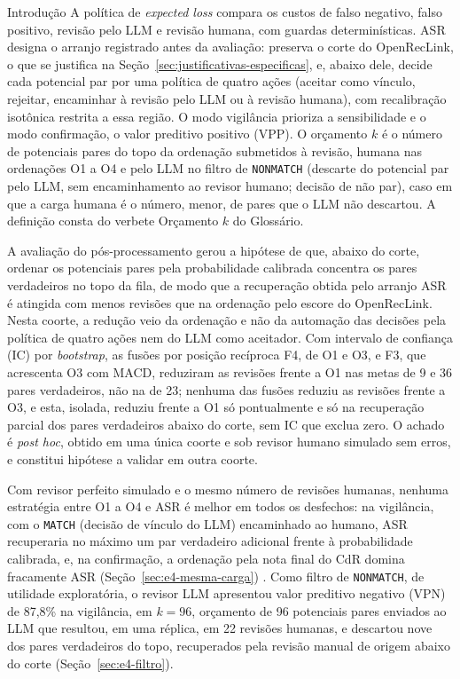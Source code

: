 \begin{chapter}{Introdução}
A política de \textit{expected loss} compara os custos de falso negativo, falso positivo, revisão pelo LLM e revisão humana, com guardas determinísticas. ASR designa o arranjo registrado antes da avaliação: preserva o corte do OpenRecLink, o que se justifica na Seção~\ref{sec:justificativas-especificas}, e, abaixo dele, decide cada potencial par por uma política de quatro ações (aceitar como vínculo, rejeitar, encaminhar à revisão pelo LLM ou à revisão humana), com recalibração isotônica restrita a essa região. O modo vigilância prioriza a sensibilidade e o modo confirmação, o valor preditivo positivo (VPP). O orçamento $k$ é o número de potenciais pares do topo da ordenação submetidos à revisão, humana nas ordenações O1 a O4 e pelo LLM no filtro de \texttt{NONMATCH} (descarte do potencial par pelo LLM, sem encaminhamento ao revisor humano; decisão de não par), caso em que a carga humana é o número, menor, de pares que o LLM não descartou. A definição consta do verbete Orçamento $k$ do Glossário.

A avaliação do pós-processamento gerou a hipótese de que, abaixo do corte, ordenar os potenciais pares pela probabilidade calibrada concentra os pares verdadeiros no topo da fila, de modo que a recuperação obtida pelo arranjo ASR é atingida com menos revisões que na ordenação pelo escore do OpenRecLink. Nesta coorte, a redução veio da ordenação e não da automação das decisões pela política de quatro ações nem do LLM como aceitador. Com intervalo de confiança (IC) por \textit{bootstrap}, as fusões por posição recíproca F4, de O1 e O3, e F3, que acrescenta O3 com MACD, reduziram as revisões frente a O1 nas metas de 9 e 36 pares verdadeiros, não na de 23; nenhuma das fusões reduziu as revisões frente a O3, e esta, isolada, reduziu frente a O1 só pontualmente e só na recuperação parcial dos pares verdadeiros abaixo do corte, sem IC que exclua zero. O achado é \textit{post hoc}, obtido em uma única coorte e sob revisor humano simulado sem erros, e constitui hipótese a validar em outra coorte.

Com revisor perfeito simulado e o mesmo número de revisões humanas, nenhuma estratégia entre O1 a O4 e ASR é melhor em todos os desfechos: na vigilância, com o \texttt{MATCH} (decisão de vínculo do LLM) encaminhado ao humano, ASR recuperaria no máximo um par verdadeiro adicional frente à probabilidade calibrada, e, na confirmação, a ordenação pela nota final do CdR domina fracamente ASR (Seção~\ref{sec:e4-mesma-carga}) \cite{Jardim2026phdrepo}. Como filtro de \texttt{NONMATCH}, de utilidade exploratória, o revisor LLM apresentou valor preditivo negativo (VPN) de 87,8\% na vigilância, em $k=96$, orçamento de 96 potenciais pares enviados ao LLM que resultou, em uma réplica, em 22 revisões humanas, e descartou nove dos pares verdadeiros do topo, recuperados pela revisão manual de origem abaixo do corte (Seção~\ref{sec:e4-filtro}).


\end{chapter}
